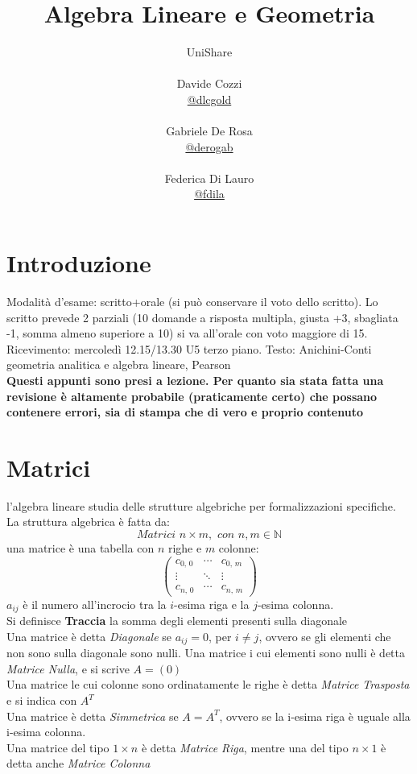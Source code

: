 \documentclass[a4paper,12pt, oneside]{book}
\title{Algebra Lineare e Geometria}
\author{UniShare\\\\Davide Cozzi\\\href{https://t.me/dlcgold}{@dlcgold}\\\\Gabriele De Rosa\\\href{https://t.me/derogab}{@derogab} \\\\Federica Di Lauro\\\href{https://t.me/f_dila}{@f\textunderscore dila}}
\date{}
\begin{document}
\maketitle


\newtheorem{teorema}{Teorema}
\newtheorem{definizione}{Definizione}
\newtheorem{esempio}{Esempio}
\newtheorem{corollario}{Corollario}
\newtheorem{lemma}{Lemma}
\newtheorem{osservazione}{Osservazione}
\newtheorem{nota}{Nota}
\newtheorem{esercizio}{Esercizio}
\tableofcontents
\renewcommand{\chaptermark}[1]{%
\markboth{\chaptername
\ \thechapter.\ #1}{}}
\renewcommand{\sectionmark}[1]{\markright{\thesection.\ #1}}
    \newcommand{\norm}[1]{ \left\lVert {#1} \right\rVert}
\chapter{Introduzione}
Modalità d'esame: scritto+orale (si può conservare il voto dello scritto). Lo scritto prevede 2 parziali (10 domande a risposta multipla, giusta +3, sbagliata -1, somma almeno superiore a 10) si va all'orale con voto maggiore di 15.
Ricevimento: mercoledì 12.15/13.30 U5 terzo piano.
Testo: Anichini-Conti geometria analitica e algebra lineare, Pearson\\
\textbf{Questi appunti sono presi a lezione. Per quanto sia stata fatta una revisione è altamente probabile (praticamente certo) che possano contenere errori, sia di stampa che di vero e proprio contenuto}
\chapter{Matrici}
l'algebra lineare studia delle strutture algebriche per formalizzazioni specifiche.
La struttura algebrica è fatta da:
$$Matrici\,\,n\times m,\,\, con \,\, n,m\in\mathbb{N}$$
una matrice è una tabella con $n$ righe e $m$ colonne:
$$\left(\begin{matrix}
c_{0,\,0} & \cdots & c_{0,\,m}\\
\vdots & \ddots & \vdots\\
c_{n,\,0} & \cdots & c_{n,\,m}
\end{matrix}\right)$$
$a_{ij}$ è il numero all'incrocio tra la $i$-esima riga e la $j$-esima colonna.\\
Si definisce \textbf{Traccia} la somma degli elementi presenti sulla diagonale\\
Una matrice è detta \textit{Diagonale} se $a_{ij}=0$, per $i\neq j$, ovvero se gli elementi che non sono sulla diagonale sono nulli.
Una matrice i cui elementi sono nulli è detta \textit{Matrice Nulla}, e si scrive $A=(0)$\\
Una matrice le cui colonne sono ordinatamente le righe è detta \textit{Matrice Trasposta} e si indica con $A^T$\\
Una matrice è detta \textit{Simmetrica} se $A=A^T$, ovvero se la i-esima riga è uguale alla i-esima colonna.\\
Una matrice del tipo $1\times n$ è detta \textit{Matrice Riga}, mentre una del tipo $n\times 1$ è detta anche \textit{Matrice Colonna}
\end{document}
